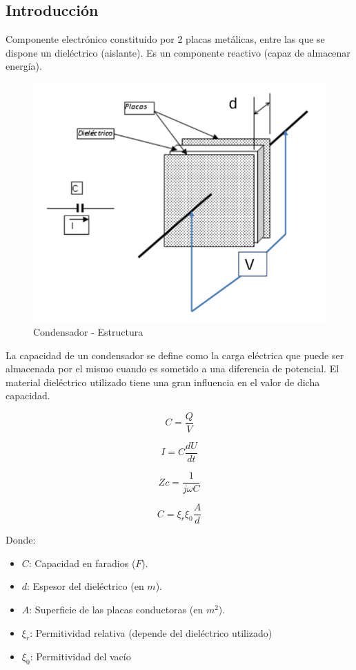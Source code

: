 \subsection{Introducción}

Componente electrónico constituido por 2 placas metálicas, entre las que se dispone un dieléctrico (aislante). Es un componente reactivo (capaz de almacenar energía).

\begin{figure}[H]
    \centering
    \includegraphics[width=0.5\linewidth]{Imagenes/Condensadores.png}
    \caption{Condensador - Estructura}
\end{figure}

La capacidad de un condensador se define como la carga eléctrica que puede ser almacenada por el mismo cuando es sometido a una diferencia de potencial. El material dieléctrico utilizado tiene una gran influencia en el valor de dicha capacidad.

\begin{equation}
    C = \frac{Q}{V}
\end{equation}

\begin{equation}
    I = C \frac{dU}{dt}
\end{equation}

\begin{equation}
    Zc = \frac{1}{j\omega C}
\end{equation}

\begin{equation}
    C = \xi_r \xi_0 \frac{A}{d}
\end{equation}

Donde:
\begin{itemize}
    \item $C$: Capacidad en faradios ($F$).
    \item $d$: Espesor del dieléctrico (en $m$).
    \item $A$: Superficie de las placas conductoras (en $m^2$).
    \item $\xi_r$: Permitividad relativa (depende del dieléctrico utilizado)
    \item $\xi_0$: Permitividad del vacío
\end{itemize}

